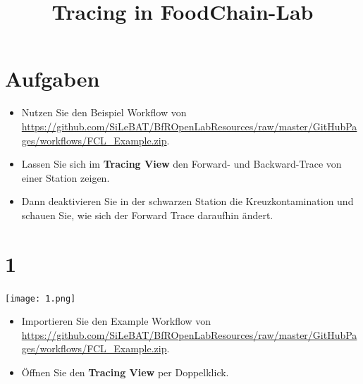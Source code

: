 \documentclass{beamer}
\title{Tracing in FoodChain-Lab}
\date{}
\begin{document}
\maketitle

\section{Aufgaben}
\begin{frame}
	\begin{itemize}
		\item Nutzen Sie den Beispiel Workflow von \url{https://github.com/SiLeBAT/BfROpenLabResources/raw/master/GitHubPages/workflows/FCL_Example.zip}.
		\item Lassen Sie sich im \textbf{Tracing View} den Forward- und Backward-Trace von einer Station zeigen.
		\item Dann deaktivieren Sie in der schwarzen Station die Kreuzkontamination und schauen Sie, wie sich der Forward Trace daraufhin ändert.
	\end{itemize}
\end{frame}

\section{1}
\begin{frame}
	\begin{center}
  		\texttt{[image: 1.png]}
	\end{center}
	\begin{itemize}
		\item Importieren Sie den Example Workflow von \url{https://github.com/SiLeBAT/BfROpenLabResources/raw/master/GitHubPages/workflows/FCL_Example.zip}.
		\item Öffnen Sie den \textbf{Tracing View} per Doppelklick.
	\end{itemize}
\end{frame}
\end{document}
